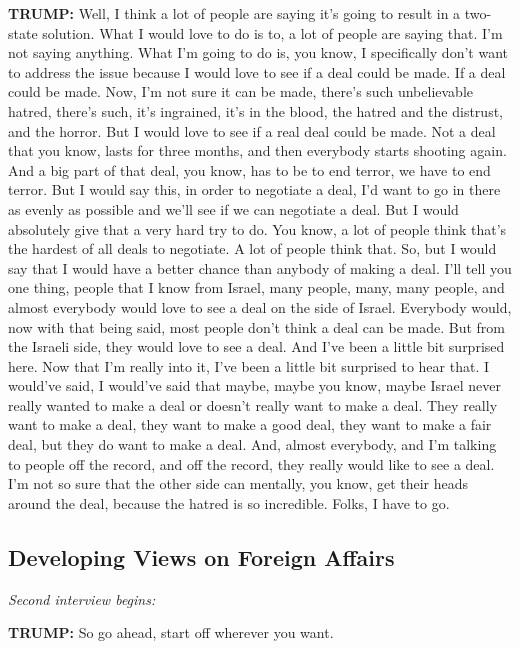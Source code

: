 \textbf{TRUMP:} Well, I think a lot of people are saying it's going to
result in a two-state solution. What I would love to do is to, a lot of
people are saying that. I'm not saying anything. What I'm going to do
is, you know, I specifically don't want to address the issue because I
would love to see if a deal could be made. If a deal could be made. Now,
I'm not sure it can be made, there's such unbelievable hatred, there's
such, it's ingrained, it's in the blood, the hatred and the distrust,
and the horror. But I would love to see if a real deal could be made.
Not a deal that you know, lasts for three months, and then everybody
starts shooting again. And a big part of that deal, you know, has to be
to end terror, we have to end terror. But I would say this, in order to
negotiate a deal, I'd want to go in there as evenly as possible and
we'll see if we can negotiate a deal. But I would absolutely give that a
very hard try to do. You know, a lot of people think that's the hardest
of all deals to negotiate. A lot of people think that. So, but I would
say that I would have a better chance than anybody of making a deal.
I'll tell you one thing, people that I know from Israel, many people,
many, many people, and almost everybody would love to see a deal on the
side of Israel. Everybody would, now with that being said, most people
don't think a deal can be made. But from the Israeli side, they would
love to see a deal. And I've been a little bit surprised here. Now that
I'm really into it, I've been a little bit surprised to hear that. I
would've said, I would've said that maybe, maybe you know, maybe Israel
never really wanted to make a deal or doesn't really want to make a
deal. They really want to make a deal, they want to make a good deal,
they want to make a fair deal, but they do want to make a deal. And,
almost everybody, and I'm talking to people off the record, and off the
record, they really would like to see a deal. I'm not so sure that the
other side can mentally, you know, get their heads around the deal,
because the hatred is so incredible. Folks, I have to go.

\hypertarget{developing-views-on-foreign-affairs}{%
\subsection{Developing Views on Foreign
Affairs}\label{developing-views-on-foreign-affairs}}

\emph{Second interview begins:}

\textbf{TRUMP:} So go ahead, start off wherever you want.

